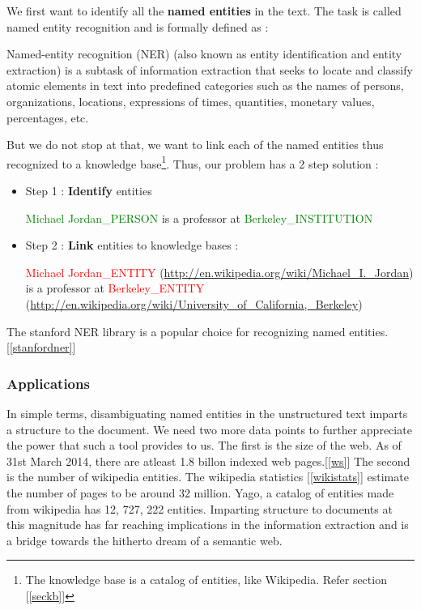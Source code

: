  We first want to identify all the \textbf{named entities} in the text. The task is called named entity recognition and is 
 formally defined as : 
 \begin{mydef}
 \label{nerdef}
   Named-entity recognition (NER) (also known as entity identification and entity extraction) is a subtask of information extraction that seeks to locate and classify 
   atomic elements in text into predefined categories such as the names of persons, organizations, locations, expressions of times, quantities, monetary values, percentages, etc.
  \end{mydef}
 But we do not stop at that, we want to link each of the named entities thus recognized to a knowledge base\footnote{The knowledge base is a catalog of entities, like Wikipedia. Refer section [\ref{seckb}]}.
 Thus, our problem has a 2 step solution : 

 
 \begin{itemize}  
  \item Step 1 : \textbf{Identify} entities
  \medskip
  
  \textcolor{green}{Michael Jordan\_PERSON} is a professor at \textcolor{green}{Berkeley\_INSTITUTION} \medskip
  \item Step 2 : \textbf{Link} entities to knowledge bases : 
  \medskip
  
  \textcolor{red}{Michael Jordan\_ENTITY} (\url{http://en.wikipedia.org/wiki/Michael_I._Jordan})  is a professor at  
  \textcolor{red}{Berkeley\_ENTITY} (\url{http://en.wikipedia.org/wiki/University_of_California,_Berkeley})
\end{itemize}

The stanford NER library is a popular choice for recognizing named entities. [\ref{stanfordner}]
\subsubsection{Applications}


In simple terms, disambiguating named entities in the unstructured text imparts a structure to the document. 
We need two more data points to further appreciate the power that such a tool provides to us.
The first is the size of the web. As of 31st March 2014, there are atleast 1.8 billon indexed web pages.[\ref{ws}]
The second is the number of wikipedia entities. The wikipedia statistics [\ref{wikistats}] estimate the number of pages to be
around 32 million. Yago, a catalog of entities made from wikipedia has 12, 727, 222 entities.	
Imparting structure to documents at this magnitude has far reaching implications in the information
extraction and is a bridge towards the hitherto dream of a semantic web.  \\


